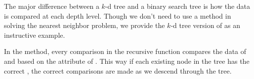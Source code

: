 

The major difference between a $k$-d tree and a binary search tree is how the data is compared at each depth level.
Though we don't need to use a  method in solving the nearest neighbor problem, we provide the $k$-d tree version of  as an instructive example.

In the  method, every comparison in the recursive  function compares the data of  and  based on the  attribute of .
This way if each existing node in the tree has the correct , the correct comparisons are made as we descend through the tree.

